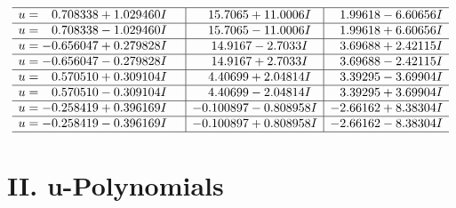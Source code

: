 \documentclass[1p]{elsarticle_modified}
\theoremstyle{definition}
\begin{document}
$$\begin{array}{c|c|c}
 \hline 
\begin{aligned}
u &= \phantom{-}0.708338 + 1.029460 I\end{aligned}
 & \phantom{-}15.7065 + 11.0006 I & \phantom{-}1.99618 - 6.60656 I \\ \hline\begin{aligned}
u &= \phantom{-}0.708338 - 1.029460 I\end{aligned}
 & \phantom{-}15.7065 - 11.0006 I & \phantom{-}1.99618 + 6.60656 I \\ \hline\begin{aligned}
u &= -0.656047 + 0.279828 I\end{aligned}
 & \phantom{-}14.9167 - 2.7033 I & \phantom{-}3.69688 + 2.42115 I \\ \hline\begin{aligned}
u &= -0.656047 - 0.279828 I\end{aligned}
 & \phantom{-}14.9167 + 2.7033 I & \phantom{-}3.69688 - 2.42115 I \\ \hline\begin{aligned}
u &= \phantom{-}0.570510 + 0.309104 I\end{aligned}
 & \phantom{-}4.40699 + 2.04814 I & \phantom{-}3.39295 - 3.69904 I \\ \hline\begin{aligned}
u &= \phantom{-}0.570510 - 0.309104 I\end{aligned}
 & \phantom{-}4.40699 - 2.04814 I & \phantom{-}3.39295 + 3.69904 I \\ \hline\begin{aligned}
u &= -0.258419 + 0.396169 I\end{aligned}
 & -0.100897 - 0.808958 I & -2.66162 + 8.38304 I \\ \hline\begin{aligned}
u &= -0.258419 - 0.396169 I\end{aligned}
 & -0.100897 + 0.808958 I & -2.66162 - 8.38304 I\\
 \hline 
 \end{array}$$\newpage
\newpage\renewcommand{\arraystretch}{1}
\centering \section*{ II. u-Polynomials}
\end{document}
